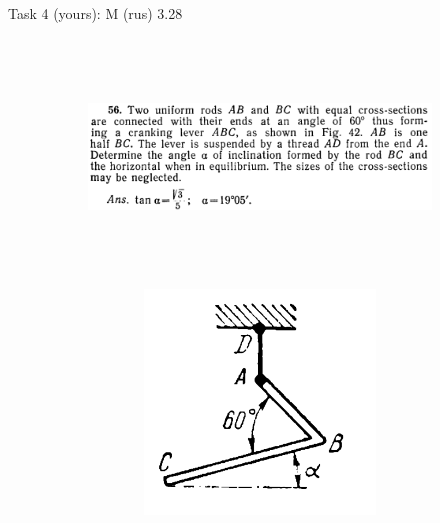 \documentclass[aspectratio=169]{beamer}
\newcommand{\fbckg}[1]{\usebackgroundtemplate{\texttt{[image: \#1]}}}%
\begin{document}
    \begin{frame}[t]{Task 4 (yours): M (rus) 3.28}
    \framesubtitle{}
        \begin{figure}[H]
            \begin{subfigure}[b]{0.69\textwidth}
                \centering\includegraphics[height=6cm,width=1\textwidth,keepaspectratio]{image18.png}
                \label{fig:image18}
            \end{subfigure}
            \begin{subfigure}[t]{0.29\textwidth}
                \centering\includegraphics[height=6cm,width=1\textwidth,keepaspectratio]{image16.png}
                \label{fig:image16}
            \end{subfigure}
        \end{figure}
    \end{frame}

\fbckg{fibeamer/figs/last_page.png}
\frame[plain]{}
\end{document}
